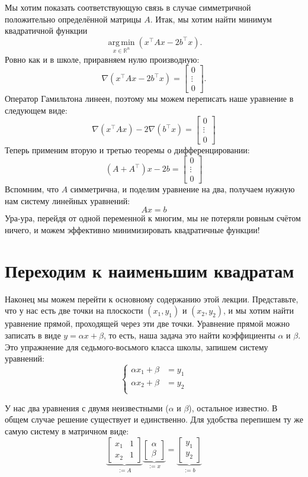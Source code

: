 \documentclass{article}
\DeclareMathOperator*{\argmin}{arg\,min}
\begin{document}
Мы хотим показать соответствующую связь в случае симметричной положительно определённой матрицы $A$.
Итак, мы хотим найти минимум квадратичной функции 
$$\argmin\limits_{x\in\mathbb R^n} (x^\top A x - 2b^\top x).$$
Ровно как и в школе, приравняем нулю производную:
$$\nabla (x^\top A x - 2b^\top x) = \begin{bmatrix}0 \\ \vdots \\ 0 \end{bmatrix}.$$
Оператор Гамильтона линеен, поэтому мы можем переписать наше уравнение в следующем виде:
$$\nabla (x^\top A x) - 2\nabla(b^\top x) = \begin{bmatrix}0 \\ \vdots \\ 0 \end{bmatrix}$$
Теперь применим вторую и третью теоремы о дифференцировании:
$$(A+A^\top)x - 2b = \begin{bmatrix}0 \\ \vdots \\ 0 \end{bmatrix}$$
Вспомним, что $A$ симметрична, и поделим уравнение на два, получаем нужную нам систему линейных уравнений:
$$Ax = b$$
Ура-ура, перейдя от одной переменной к многим, мы не потеряли ровным счётом ничего, и можем эффективно минимизировать квадратичные функции!


\section{Переходим к наименьшим квадратам}
Наконец мы можем перейти к основному содержанию этой лекции. Представьте, что у нас есть две точки на плоскости $(x_1, y_1)$ и $(x_2, y_2)$, и мы хотим найти уравнение прямой, проходящей через эти две точки.
Уравнение прямой можно записать в виде $y = \alpha x + \beta$, то есть, наша задача это найти коэффициенты $\alpha$ и $\beta$. Это упражнение для седьмого-восьмого класса школы, запишем систему уравнений:
$$
\left\{
\begin{split}
\alpha x_1 + \beta &= y_1\\
\alpha x_2 + \beta &= y_2\\
\end{split}
\right.
$$

У нас два уравнения с двумя неизвестными ($\alpha$ и $\beta$), остальное известно.
В общем случае решение существует и единственно. Для удобства перепишем ту же самую систему в матричном виде:
$$
\underbrace{\begin{bmatrix}x_1  & 1 \\ x_2 & 1 \end{bmatrix}}_{:=A} 
\underbrace{\begin{bmatrix} \alpha \\ \beta \end{bmatrix}}_{:=x} = \underbrace{\begin{bmatrix} y_1 \\ y_2 \end{bmatrix}}_{:=b}
$$
\end{document}
